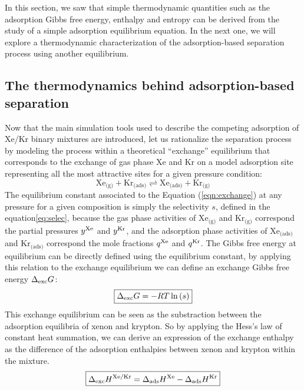 \documentclass[main.tex]{subfiles}
\begin{document}
In this section, we saw that simple thermodynamic quantities such as the adsorption Gibbs free energy, enthalpy and entropy can  be derived from the study of a simple adsorption equilibrium equation. In the next one, we will explore a thermodynamic characterization of the adsorption-based separation process using another equilibrium. 

\subsection{The thermodynamics behind adsorption-based separation}

Now that the main simulation tools used to describe the  competing adsorption of Xe/Kr binary mixtures are introduced, let us rationalize the separation process by modeling the process within a theoretical ``exchange'' equilibrium that corresponds to the exchange of gas phase Xe and Kr on a model adsorption site representing all the most attractive sites for a given pressure condition:
\begin{equation} \label{eqn:exchange}
    \text{Xe}_{\text{(g)}} + \text{Kr}_{\text{(ads)}}
    \rightleftharpoons \text{Xe}_{\text{(ads)}} + \text{Kr}_{\text{(g)}}
\end{equation}
The equilibrium constant associated to the Equation (\ref{eqn:exchange}) at any pressure for a given composition is simply the selectivity $s$, defined in the equation\ref{eq:selec}, because the gas phase activities of $\text{Xe}_{\text{(g)}}$ and $\text{Kr}_{\text{(g)}}$ correspond the partial pressures $y^{\text{Xe}}$ and $y^{\text{Kr}}$, and the adsorption phase activities of $\text{Xe}_{\text{(ads)}}$ and $\text{Kr}_{\text{(ads)}}$ correspond the mole fractions $q^{\text{Xe}}$ and $q^{\text{Kr}}$. The Gibbs free energy at equilibrium can be directly defined using the equilibrium constant, by applying this relation to the exchange equilibrium we can define an exchange Gibbs free energy $\Delta_{\text{exc}}G$:
\begin{equation}
  \boxed{
  \Delta_{\text{exc}}G = -RT \ln\left(s\right)
  }
\end{equation}
This exchange equilibrium can be seen as the substraction between the adsorption equilibria of xenon and krypton. So by applying the Hess's law of constant heat summation, we can derive an expression of the exchange enthalpy as the difference of the adsorption enthalpies between xenon and krypton within the mixture. 
\begin{equation}
  \boxed{
  \Delta_{\text{exc}}H^{\text{Xe/Kr}} = \Delta_{\text{ads}}H^{\text{Xe}} - \Delta_{\text{ads}}H^{\text{Kr}}
  }
\end{equation}
\end{document}

